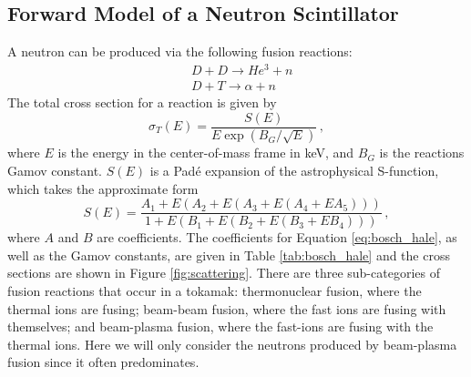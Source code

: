 \subsection{Forward Model of a Neutron Scintillator}
A neutron can be produced via the following fusion reactions:
\begin{equation}\label{eq:D_D}
\begin{split}
    &D + D \rightarrow He^3 + n\\
    &D + T \rightarrow \alpha + n
\end{split}
\end{equation}
The total cross section for a reaction is given by
\begin{equation}
        \sigma_T(E) = \frac{S(E)}{E\exp(B_G/\sqrt{E})}\,,
\end{equation}
where $E$ is the energy in the center-of-mass frame in keV, and $B_G$ is the reactions Gamov constant. $S(E)$ is a Pad\'{e} expansion of the astrophysical S-function, which takes the approximate form\cite{bosch1992,mfeformulary}
\begin{equation}\label{eq:bosch_hale}
    S(E) = \frac{A_1 + E(A_2 + E(A_3 + E(A_4 + E A_5)))}{1 + E(B_1 + E(B_2 + E(B_3 + E B_4)))}\,,
\end{equation}
where $A$ and $B$ are coefficients. The coefficients for Equation \ref{eq:bosch_hale}, as well as the Gamov constants, are given in Table \ref{tab:bosch_hale} and the cross sections are shown in Figure \ref{fig:scattering}.
There are three sub-categories of fusion reactions that occur in a tokamak: thermonuclear fusion, where the thermal ions are fusing; beam-beam fusion, where the fast ions are fusing with themselves; and beam-plasma fusion, where the fast-ions are fusing with the thermal ions. Here we will only consider the neutrons produced by beam-plasma fusion since it often predominates.
